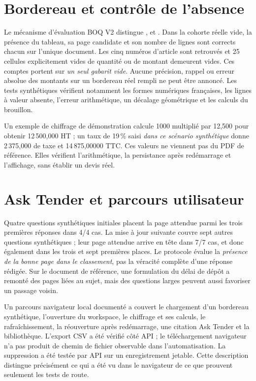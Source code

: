 \section{Bordereau et contrôle de l'absence}
Le mécanisme d'évaluation BOQ V2 distingue \texttt{}, \texttt{} et \texttt{}. Dans la cohorte réelle vide, la présence du tableau, sa page candidate et son nombre de lignes sont corrects chacun sur l'unique document. Les cinq numéros d'article sont retrouvés et 25 cellules explicitement vides de quantité ou de montant demeurent vides. Ces comptes portent sur \emph{un seul gabarit vide}. Aucune précision, rappel ou erreur absolue des montants sur un bordereau réel rempli ne peut être annoncé. Les tests synthétiques vérifient notamment les formes numériques françaises, les lignes à valeur absente, l'erreur arithmétique, un décalage géométrique et les calculs du brouillon.

Un exemple de chiffrage de démonstration calcule 1000 multiplié par 12,500 pour obtenir 12\,500,000 HT ; un taux de 19\,\% saisi \emph{dans ce scénario synthétique} donne 2\,375,000 de taxe et 14\,875,00000 TTC. Ces valeurs ne viennent pas du PDF de référence. Elles vérifient l'arithmétique, la persistance après redémarrage et l'affichage, sans établir un devis réel.

\section{Ask Tender et parcours utilisateur}
Quatre questions synthétiques initiales placent la page attendue parmi les trois premières réponses dans 4/4 cas. La mise à jour suivante couvre sept autres questions synthétiques ; leur page attendue arrive en tête dans 7/7 cas, et donc également dans les trois et sept premières places. Le protocole évalue la \emph{présence de la bonne page dans le classement}, pas la véracité complète d'une réponse rédigée. Sur le document de référence, une formulation du délai de dépôt a remonté des pages liées au sujet, mais des questions larges peuvent aussi favoriser un passage voisin.

Un parcours navigateur local documenté a couvert le chargement d'un bordereau synthétique, l'ouverture du workspace, le chiffrage et ses calculs, le rafraîchissement, la réouverture après redémarrage, une citation Ask Tender et la bibliothèque. L'export CSV a été vérifié côté API ; le téléchargement navigateur n'a pas produit de chemin de fichier observable dans l'automatisation. La suppression a été testée par API sur un enregistrement jetable. Cette description distingue précisément ce qui a été vu dans le navigateur de ce que prouvent seulement les tests de route.

